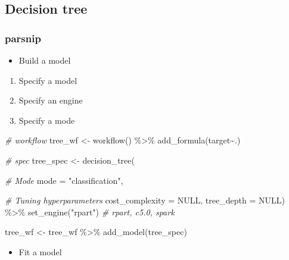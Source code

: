 \documentclass[
]{book}
\newenvironment{Shaded}{\begin{snugshade}}{\end{snugshade}}
\newcommand{\AttributeTok}[1]{\textcolor[rgb]{0.77,0.63,0.00}{#1}}
\newcommand{\CommentTok}[1]{\textcolor[rgb]{0.56,0.35,0.01}{\textit{#1}}}
\newcommand{\ConstantTok}[1]{\textcolor[rgb]{0.00,0.00,0.00}{#1}}
\newcommand{\FunctionTok}[1]{\textcolor[rgb]{0.00,0.00,0.00}{#1}}
\newcommand{\NormalTok}[1]{#1}
\newcommand{\OtherTok}[1]{\textcolor[rgb]{0.56,0.35,0.01}{#1}}
\newcommand{\SpecialCharTok}[1]{\textcolor[rgb]{0.00,0.00,0.00}{#1}}
\newcommand{\StringTok}[1]{\textcolor[rgb]{0.31,0.60,0.02}{#1}}
\providecommand{\tightlist}{%
  \setlength{\itemsep}{0pt}\setlength{\parskip}{0pt}}
\begin{document}
\hypertarget{decision-tree}{%
\subsection{Decision tree}\label{decision-tree}}

\hypertarget{parsnip-1}{%
\subsubsection{parsnip}\label{parsnip-1}}

\begin{itemize}
\tightlist
\item
  Build a model
\end{itemize}

\begin{enumerate}
\def\labelenumi{\arabic{enumi}.}
\tightlist
\item
  Specify a model
\item
  Specify an engine
\item
  Specify a mode
\end{enumerate}

\begin{Shaded}
\begin{Highlighting}[]
\CommentTok{\# workflow }
\NormalTok{tree\_wf }\OtherTok{\textless{}{-}} \FunctionTok{workflow}\NormalTok{() }\SpecialCharTok{\%\textgreater{}\%} \FunctionTok{add\_formula}\NormalTok{(target}\SpecialCharTok{\textasciitilde{}}\NormalTok{.)}

\CommentTok{\# spec }
\NormalTok{tree\_spec }\OtherTok{\textless{}{-}} \FunctionTok{decision\_tree}\NormalTok{(}
  
           \CommentTok{\# Mode }
           \AttributeTok{mode =} \StringTok{"classification"}\NormalTok{,}
           
           \CommentTok{\# Tuning hyperparameters}
           \AttributeTok{cost\_complexity =} \ConstantTok{NULL}\NormalTok{, }
           \AttributeTok{tree\_depth =} \ConstantTok{NULL}\NormalTok{) }\SpecialCharTok{\%\textgreater{}\%}
  \FunctionTok{set\_engine}\NormalTok{(}\StringTok{"rpart"}\NormalTok{) }\CommentTok{\# rpart, c5.0, spark}

\NormalTok{tree\_wf }\OtherTok{\textless{}{-}}\NormalTok{ tree\_wf }\SpecialCharTok{\%\textgreater{}\%} \FunctionTok{add\_model}\NormalTok{(tree\_spec)}
\end{Highlighting}
\end{Shaded}

\begin{itemize}
\tightlist
\item
  Fit a model
\end{itemize}
\end{document}
